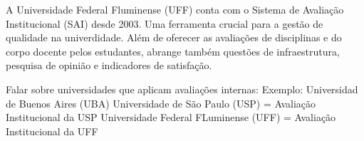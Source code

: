 A Universidade Federal Fluminense (UFF) conta com o Sistema de Avaliação Institucional (SAI) desde 2003. Uma ferramenta
crucial para a gestão de qualidade na univerdidade. Além de oferecer as avaliações de disciplinas e do corpo docente pelos estudantes, abrange também questões de infraestrutura, pesquisa de opinião e indicadores de satisfação.

Falar sobre universidades que aplicam avaliações internas:
Exemplo: 
Universidad de Buenos Aires (UBA)
Universidade de São Paulo (USP) = Avaliação Institucional da USP
Universidade Federal FLuminense (UFF) = Avaliação Institucional da UFF

%


